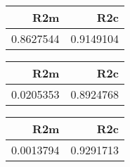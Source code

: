 \documentclass[11pt]{report}
\begin{document}
\begin{tabular}{r|r}
\hline
R2m & R2c\\
\hline
0.8627544 & 0.9149104\\
\hline
\end{tabular}
\begin{tabular}{r|r}
\hline
R2m & R2c\\
\hline
0.0205353 & 0.8924768\\
\hline
\end{tabular}
\begin{tabular}{r|r}
\hline
R2m & R2c\\
\hline
0.0013794 & 0.9291713\\
\hline
\end{tabular}
\end{document}
